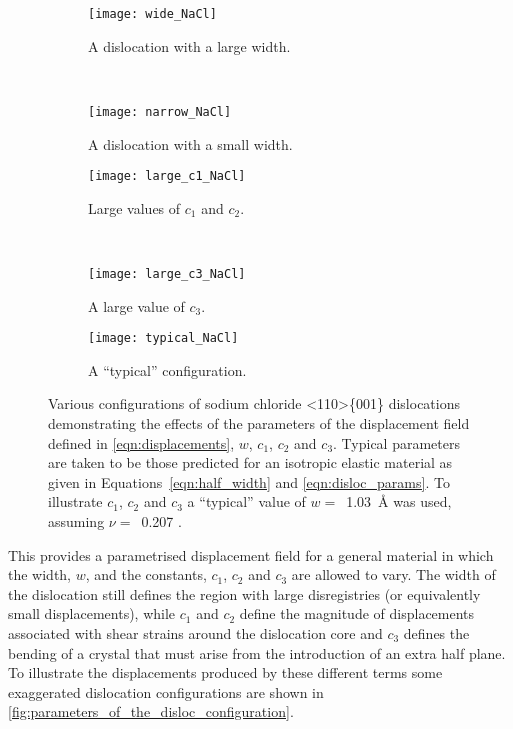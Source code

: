 \begin{figure}
\centering

    \begin{subfigure}{0.4\textwidth}
    \centering
    \texttt{[image: wide\_NaCl]}
    \caption{A dislocation with a large width.}
    \end{subfigure}
    ~
    \begin{subfigure}{0.4\textwidth}
    \centering
    \texttt{[image: narrow\_NaCl]}
    \caption{A dislocation with a small width.}
    \end{subfigure}

	\begin{subfigure}{0.4\textwidth}
	\centering
    \texttt{[image: large\_c1\_NaCl]}
    \caption{Large values of $c_1$ and $c_2$.}
	\end{subfigure}
    ~
	\begin{subfigure}{0.4\textwidth}
	\centering
    \texttt{[image: large\_c3\_NaCl]}
    \caption{A large value of $c_3$.}
	\end{subfigure}

    \begin{subfigure}{0.8\textwidth}
    \centering
    \texttt{[image: typical\_NaCl]}
    \caption{A ``typical'' configuration.}
    \end{subfigure}

\caption[The displacement field around an edge dislocation in rock salt.]{Various configurations of sodium chloride <110>\{001\} dislocations demonstrating the effects of the parameters of the displacement field defined in \autoref{eqn:displacements}, $w$, $c_1$, $c_2$ and $c_3$. Typical parameters are taken to be those predicted for an isotropic elastic material as given in  Equations~\ref{eqn:half_width} and \ref{eqn:disloc_params}. To illustrate $c_1$, $c_2$ and $c_3$ a ``typical'' value of $w=$~\SI{1.03}{\angstrom} was used, assuming $\nu =$~\num{0.207} \cite{Theocaris1994}.\label{fig:parameters_of_the_disloc_configuration}}
\end{figure}


This provides a parametrised displacement field for a general material in which the width, $w$, and the constants, $c_1$, $c_2$ and $c_3$ are allowed to vary. The width of the dislocation still defines the region with large disregistries (or equivalently small displacements), while $c_1$ and $c_2$ define the magnitude of displacements associated with shear strains around the dislocation core and $c_3$ defines the bending of a crystal that must arise from the introduction of an extra half plane.
To illustrate the displacements produced by these different terms some exaggerated dislocation configurations are shown in \autoref{fig:parameters_of_the_disloc_configuration}.





